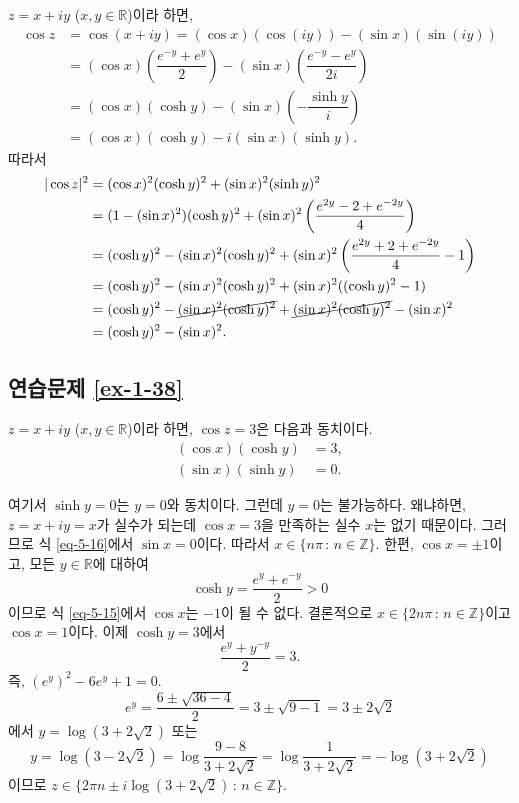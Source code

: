 $z=x+iy$ ($x,y\in\mathbb R$)이라 하면,
\begin{align*}
\cos z &= \cos(x+iy) = (\cos x)(\cos(iy)) - (\sin x)(\sin(iy)) \\
&= (\cos x)\left( \dfrac{e^{-y}+e^y}2\right)
- (\sin x)\left( \dfrac{e^{-y}-e^y}{2i}\right) \\
&= (\cos x)(\cosh y) - (\sin x)\left(-\dfrac{\sinh y}i\right) \\
&= (\cos x)(\cosh y) - i(\sin x)(\sinh y).
\end{align*}
따라서
\begin{align*}
|\cos z|^2 &= (\cos x)^2(\cosh y)^2 + (\sin x)^2(\sinh y)^2 \\
&= (1-(\sin x)^2)(\cosh y)^2 + (\sin x)^2\left(\dfrac{e^{2y} -2 + e^{-2y}}4\right) \\
&= (\cosh y)^2  - (\sin x)^2(\cosh y)^2 + (\sin x)^2
\left(\dfrac{e^{2y} + 2 + e^{-2y}}4 -1\right) \\
&= (\cosh y)^2  - (\sin x)^2(\cosh y)^2 + (\sin x)^2((\cosh y)^2-1) \\
&=  (\cosh y)^2  - \cancel{(\sin x)^2(\cosh y)^2} + \cancel{(\sin x)^2(\cosh y)^2}
-(\sin x)^2 \\
&= (\cosh y)^2 - (\sin x)^2.
\end{align*}

\subsection*{연습문제 \ref{ex-1-38}}

$z=x+iy$ ($x,y\in\mathbb R$)이라 하면,
$\cos z =3$은 다음과 동치이다.
\begin{align}
(\cos x)(\cosh y) &= 3, \label{eq-5-15} \\
(\sin x)(\sinh y) &= 0. \label{eq-5-16}
\end{align}

여기서 $\sinh y=0$는 $y=0$와 동치이다. 
그런데 $y=0$는 불가능하다.
왜냐하면, $z=x+iy=x$가 실수가 되는데 $\cos x =3$을 만족하는 실수 $x$는 없기 때문이다.
그러므로 식 \eqref{eq-5-16}에서 $\sin x = 0$이다.
따라서 $x \in \{ n\pi \,:\, n\in\mathbb Z\}$.
한편, $\cos x = \pm 1$이고, 모든 $y\in\mathbb R$에 대하여
\[
\cosh y = \dfrac{e^y + e^{-y}}2 > 0
\]
이므로 식 \eqref{eq-5-15}에서 $\cos x$는 $-1$이 될 수 없다.
결론적으로 $x \in \{ 2n\pi \,:\, n\in\mathbb Z\}$이고 $\cos x =1$이다.
이제 $\cosh y = 3$에서
\[
\dfrac{e^y + y^{-y}}2 = 3.
\]
즉, $(e^y)^2 - 6e^y+1=0$.
\[
e^y = \dfrac{6\pm \sqrt{36-4}}2 = 3 \pm \sqrt{9-1} = 3\pm 2\sqrt{2}
\]
에서 $y=\log(3+2\sqrt{2})$ 또는 
\[
y=\log(3-2\sqrt{2}) = \log\dfrac{9-8}{3+2\sqrt{2}} = \log \dfrac1{3+2\sqrt{2}} 
= -\log(3+2\sqrt{2})
\]
이므로
$z \in \{ 2\pi n \pm i \log(3+2\sqrt{2}) \,:\, n\in\mathbb Z\}$.

